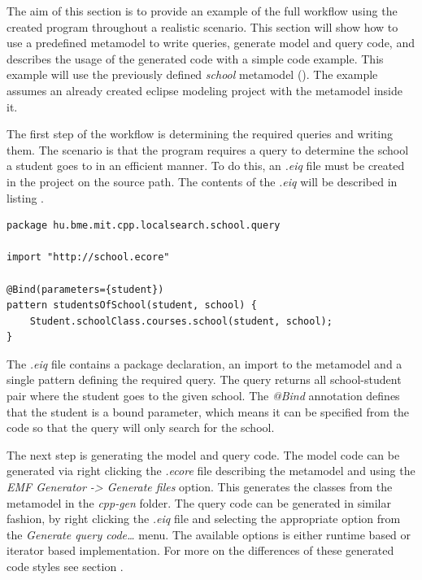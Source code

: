 The aim of this section is to provide an example of the full workflow using the
created program throughout a realistic scenario. This section will show how to
use a predefined metamodel to write queries, generate model and query code, and
describes the usage of the generated code with a simple code example. This
example will use the previously defined \emph{school} metamodel
(). The example assumes an already created
eclipse modeling project with the metamodel inside it.

The first step of the workflow is determining the required queries and writing
them. The scenario is that the \CPP{} program requires a query to determine the
school a student goes to in an efficient manner. To do this, an \emph{.eiq} file
must be created in the project on the source path. The contents of the
\emph{.eiq} will be described in listing .

\begin{lstlisting}[frame=single,float=!ht,language=IQPL,
label=listing:example_school_eiq, caption=The \emph{.eiq} file for the example
project] 
package hu.bme.mit.cpp.localsearch.school.query

import "http://school.ecore"

@Bind(parameters={student})
pattern studentsOfSchool(student, school) {
	Student.schoolClass.courses.school(student, school);
}
\end{lstlisting}

The \emph{.eiq} file contains a package declaration, an import to the metamodel
and a single pattern defining the required query. The query returns all
school-student pair where the student goes to the given school. The \emph{@Bind}
annotation defines that the student is a bound parameter, which means it can be
specified from the code so that the query will only search for the school.

The next step is generating the model and query code. The model code can be
generated via right clicking the \emph{.ecore} file describing the metamodel
and using the \emph{EMF Generator -> Generate \CPP{} files} option. This generates
the \CPP{} classes from the metamodel in the \emph{cpp-gen} folder. The query
code can be generated in similar fashion, by right clicking the \emph{.eiq} file
and selecting the appropriate option from the \emph{Generate query code\ldots}
menu. The available options is either runtime based or iterator based
implementation. For more on the differences of these generated code styles see
section .

